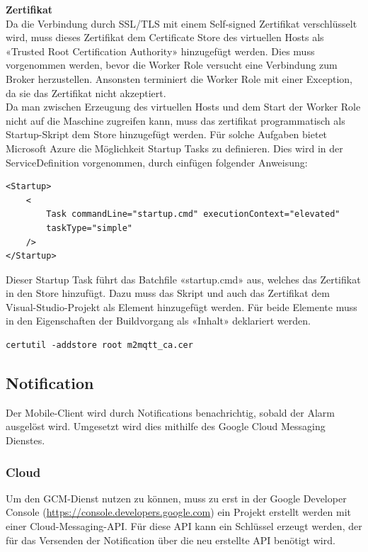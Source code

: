 \textbf{Zertifikat} \\
Da die Verbindung durch SSL/TLS mit einem Self-signed Zertifikat verschlüsselt wird, muss dieses Zertifikat dem Certificate Store des virtuellen Hosts als «Trusted Root Certification Authority» hinzugefügt werden. Dies muss vorgenommen werden, bevor die Worker Role versucht eine Verbindung zum Broker herzustellen. Ansonsten terminiert die Worker Role mit einer Exception, da sie das Zertifikat nicht akzeptiert. \\
Da man zwischen Erzeugung des virtuellen Hosts und dem Start der Worker Role nicht auf die Maschine zugreifen kann, muss das zertifikat programmatisch als Startup-Skript dem Store hinzugefügt werden. Für solche Aufgaben bietet Microsoft Azure die Möglichkeit Startup Tasks zu definieren. Dies wird in der ServiceDefinition vorgenommen, durch einfügen folgender Anweisung:
\begin{lstlisting}[style=csharp, caption=ServiceDefinition.csdef - Startup Task]
<Startup>
	<
		Task commandLine="startup.cmd" executionContext="elevated"
		taskType="simple"
	/>
</Startup>
\end{lstlisting}
Dieser Startup Task führt das Batchfile «startup.cmd» aus, welches das Zertifikat in den Store hinzufügt. Dazu muss das Skript und auch das Zertifikat dem Visual-Studio-Projekt als Element hinzugefügt werden. Für beide Elemente muss in den Eigenschaften der Buildvorgang als «Inhalt» deklariert werden.

\begin{lstlisting}[style=csharp, caption=startup.cmd - Zertifikat hinzufügen]
certutil -addstore root m2mqtt_ca.cer
\end{lstlisting}

\subsection{Notification}
Der Mobile-Client wird durch Notifications benachrichtig, sobald der Alarm ausgelöst wird. Umgesetzt wird dies mithilfe des Google Cloud Messaging Dienstes.

\subsubsection{Cloud}
Um den GCM-Dienst nutzen zu können, muss zu erst in der Google Developer Console (\url{https://console.developers.google.com}) ein Projekt erstellt werden mit einer Cloud-Messaging-API. Für diese API kann ein Schlüssel erzeugt werden, der für das Versenden der Notification über die neu erstellte API benötigt wird.

